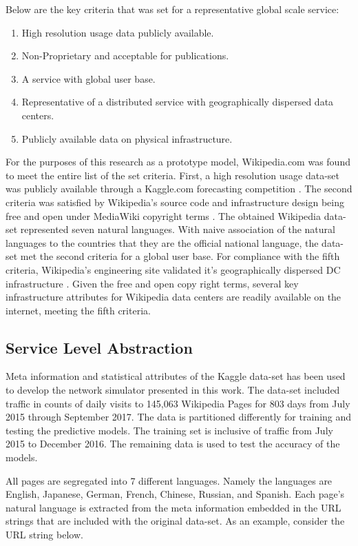     Below are the key criteria that was set for a representative global scale service:
    \begin{enumerate}
        \item High resolution usage data publicly available.
        \item Non-Proprietary and acceptable for publications. 
        \item A service with global user base.
        \item Representative of a distributed service with geographically dispersed data centers.
        \item Publicly available data on physical infrastructure.
    \end{enumerate}
    
    For the purposes of this research as a prototype model, Wikipedia.com was found to meet the entire list of the set criteria. First, a high resolution usage data-set was publicly available through a Kaggle.com forecasting competition \cite{kaggle17}. The second criteria was satisfied by Wikipedia's source code and infrastructure design being free and open under MediaWiki copyright terms \cite{wiki_media}. The obtained Wikipedia data-set represented seven natural languages. With naive association of the natural languages to the countries that they are the official national language, the data-set met the second criteria for a global user base. For compliance with the fifth criteria, Wikipedia's engineering site validated it's geographically dispersed DC infrastructure \cite{wiki_locs}. Given the free and open copy right terms, several key infrastructure attributes for Wikipedia data centers are readily available on the internet, meeting the fifth criteria.
    
\subsection{Service Level Abstraction}
    
    Meta information and statistical attributes of the Kaggle data-set has been used to develop the network simulator presented in this work. The data-set included traffic in counts of daily visits to 145,063 Wikipedia Pages for 803 days from July 2015 through September 2017. The data is partitioned differently for training and testing the predictive models. The training set is inclusive of traffic from July 2015 to December 2016. The remaining data is used to test the accuracy of the models. 
    
    All pages are segregated into 7 different languages. Namely the languages are English, Japanese, German, French, Chinese, Russian, and Spanish. Each page's natural language is extracted from the meta information embedded in the URL strings that are included with the original data-set. As an example, consider the URL string below.
    
